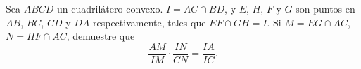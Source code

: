 Sea $ABCD$ un cuadrilátero convexo. $I=AC\cap BD$, y $E$, $H$, $F$ y $G$ son puntos en $AB$, $BC$, $CD$ y $DA$ respectivamente, tales que $EF \cap GH= I$. Si $M=EG \cap AC$, $N=HF \cap AC$, demuestre que \[\frac{AM}{IM}\cdot \frac{IN}{CN}=\frac{IA}{IC}.\]
